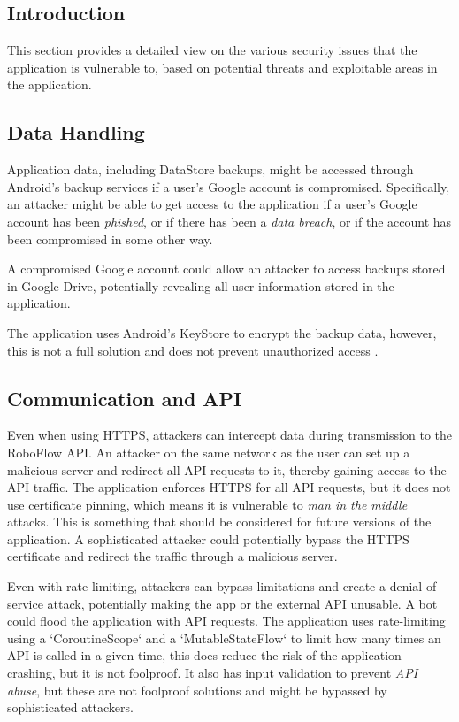 \subsection{Introduction}
This section provides a detailed view on the various security issues that the application is vulnerable to, based on potential threats and exploitable areas in the application.

\subsection{Data Handling}

Application data, including DataStore backups, might be accessed through Android's backup services if a user's Google account is compromised. Specifically, an attacker might be able to get access to the application if a user's Google account has been \textit{phished}, or if there has been a \textit{data breach}, or if the account has been compromised in some other way.

A compromised Google account could allow an attacker to access backups stored in Google Drive, potentially revealing all user information stored in the application.

The application uses Android's KeyStore to encrypt the backup data, however, this is not a full solution and does not prevent unauthorized access \cite{bib:android_data_backup}.

\subsection{Communication and API}
Even when using HTTPS, attackers can intercept data during transmission to the RoboFlow API. An attacker on the same network as the user can set up a malicious server and redirect all API requests to it, thereby gaining access to the API traffic. The application enforces HTTPS for all API requests, but it does not use certificate pinning, which means it is vulnerable to \textit{man in the middle} attacks. This is something that should be considered for future versions of the application. A sophisticated attacker could potentially bypass the HTTPS certificate and redirect the traffic through a malicious server. \cite{bib:owasp_top_ten}

Even with rate-limiting, attackers can bypass limitations and create a denial of service attack, potentially making the app or the external API unusable. A bot could flood the application with API requests. The application uses rate-limiting using a `CoroutineScope` and a `MutableStateFlow` to limit how many times an API is called in a given time, this does reduce the risk of the application crashing, but it is not foolproof. It also has input validation to prevent \textit{API abuse}, but these are not foolproof solutions and might be bypassed by sophisticated attackers.

